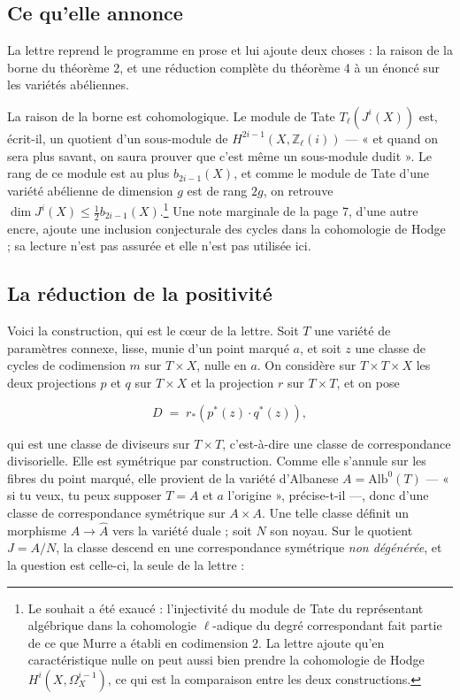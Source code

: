 \documentclass[11pt,a4paper]{article}
\begin{document}
\subsection*{Ce qu'elle annonce}

La lettre reprend le programme en prose et lui ajoute deux choses : la raison de
la borne du théorème 2, et une réduction complète du théorème 4 à un énoncé sur
les variétés abéliennes.

La raison de la borne est cohomologique. Le module de Tate $T_{\ell}(J^{i}(X))$
est, écrit-il, un quotient d'un sous-module de $H^{2i-1}(X,
\mathbb{Z}_{\ell}(i))$ — « et quand on sera plus savant, on saura prouver que
c'est même un sous-module dudit ». Le rang de ce module est au plus
$b_{2i-1}(X)$, et comme le module de Tate d'une variété abélienne de dimension
$g$ est de rang $2g$, on retrouve
$\dim J^{i}(X) \leq \tfrac{1}{2}b_{2i-1}(X)$.\footnote{Le souhait a été exaucé :
l'injectivité du module de Tate du représentant algébrique dans la cohomologie
$\ell$-adique du degré correspondant fait partie de ce que Murre a établi en
codimension $2$. La lettre ajoute qu'en caractéristique nulle on peut aussi bien
prendre la cohomologie de Hodge $H^{i}(X,\Omega^{i-1}_{X})$, ce qui est la
comparaison entre les deux constructions.} Une note marginale de la page 7,
d'une autre encre, ajoute une inclusion conjecturale des cycles dans la
cohomologie de Hodge ; sa lecture n'est pas assurée et elle n'est pas utilisée
ici.

\subsection*{La réduction de la positivité}

Voici la construction, qui est le cœur de la lettre. Soit $T$ une variété
de paramètres connexe, lisse, munie d'un point marqué $a$, et soit $z$ une
classe de cycles de codimension $m$ sur $T\times X$, nulle en $a$. On considère
sur $T\times T\times X$ les deux projections $p$ et $q$ sur $T\times X$ et la
projection $r$ sur $T\times T$, et on pose

\[
  D \;=\; r_{*}\!\left(p^{*}(z)\cdot q^{*}(z)\right),
\]

qui est une classe de diviseurs sur $T\times T$, c'est-à-dire une classe de
correspondance divisorielle. Elle est symétrique par construction. Comme elle
s'annule sur les fibres du point marqué, elle provient de la variété d'Albanese
$A = \mathrm{Alb}^{0}(T)$ — « si tu veux, tu peux supposer $T = A$ et $a$
l'origine », précise-t-il —, donc d'une classe de correspondance symétrique sur
$A\times A$. Une telle classe définit un morphisme $A \to \hat{A}$ vers la
variété duale ; soit $N$ son noyau. Sur le quotient $J = A/N$, la classe
descend en une correspondance symétrique \emph{non dégénérée}, et la question
est celle-ci, la seule de la lettre :
\end{document}
